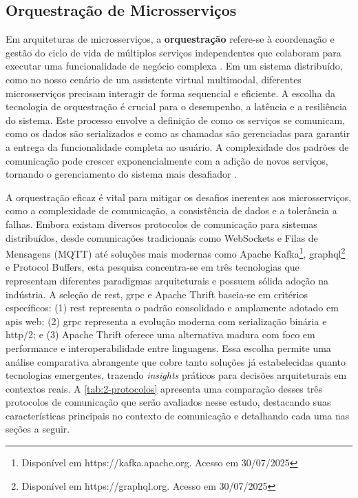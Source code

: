 \subsection{Orquestração de Microsserviços}

Em arquiteturas de microsserviços, a \textbf{orquestração} refere-se à coordenação e gestão do ciclo de vida de múltiplos serviços independentes que colaboram para executar uma funcionalidade de negócio complexa \cite{newman_building_2022}. Em um sistema distribuído, como no nosso cenário de um assistente virtual multimodal, diferentes microsserviços precisam interagir de forma sequencial e eficiente. A escolha da tecnologia de orquestração é crucial para o desempenho, a latência e a resiliência do sistema. Este processo envolve a definição de como os serviços se comunicam, como os dados são serializados e como as chamadas são gerenciadas para garantir a entrega da funcionalidade completa ao usuário. A complexidade dos padrões de comunicação pode crescer exponencialmente com a adição de novos serviços, tornando o gerenciamento do sistema mais desafiador \cite{kleppmann_designing_2017}.

A orquestração eficaz é vital para mitigar os desafios inerentes aos microsserviços, como a complexidade de comunicação, a consistência de dados e a tolerância a falhas. Embora existam diversos protocolos de comunicação para sistemas distribuídos, desde comunicações tradicionais como WebSockets e Filas de Mensagens (MQTT) até soluções mais modernas como Apache Kafka\footnote{Disponível em https://kafka.apache.org. Acesso em 30/07/2025}, \acrshort{graphql}\footnote{Disponível em  https://graphql.org. Acesso em 30/07/2025} e Protocol Buffers, esta pesquisa concentra-se em três tecnologias que representam diferentes paradigmas arquiteturais e possuem sólida adoção na indústria\cite{jetbrains_state_2024}. A seleção de \gls{rest}, \gls{grpc} e Apache Thrift baseia-se em critérios específicos: (1) \gls{rest} representa o padrão consolidado e amplamente adotado em \gls{api}s web; (2) \gls{grpc} representa a evolução moderna com serialização binária e \acrshort{http}/2; e (3) Apache Thrift oferece uma alternativa madura com foco em performance e interoperabilidade entre linguagens. Essa escolha permite uma análise comparativa abrangente que cobre tanto soluções já estabelecidas quanto tecnologias emergentes, trazendo \textit{insights} práticos para decisões arquiteturais em contextos reais. A \autoref{tab:2-protocolos} apresenta uma comparação desses três protocolos de comunicação que serão avaliados nesse estudo, destacando suas características principais no contexto de comunicação e detalhando cada uma nas seções a seguir.

